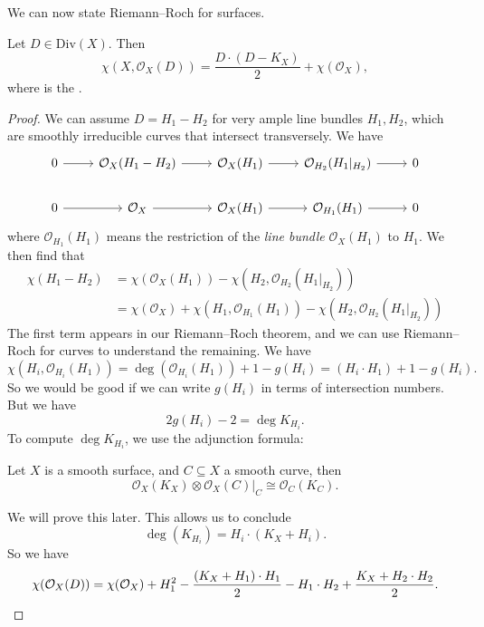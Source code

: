 \documentclass[a4paper]{article}
\newcommand\Div{\mathrm{Div}}
\begin{document}
We can now state Riemann--Roch for surfaces.
\begin{thm}
  Let $D \in \Div(X)$. Then
  \[
    \chi(X, \mathcal{O}_X(D)) = \frac{D \cdot (D - K_X)}{2} + \chi(\mathcal{O}_X),
  \]
  where  is the .
\end{thm}

\begin{proof}
  We can assume $D = H_1 - H_2$ for very ample line bundles $H_1, H_2$, which are smoothly irreducible curves that intersect transversely. We have
  \[
    \begin{tikzcd}
      0 \ar[r] & \mathcal{O}_X(H_1 - H_2) \ar[r] & \mathcal{O}_X(H_1) \ar[r] & \mathcal{O}_{H_2}(H_1|_{H_2}) \ar[r] & 0\\
      0 \ar[r] & \mathcal{O}_X \ar[r] & \mathcal{O}_X(H_1) \ar[r] & \mathcal{O}_{H_1}(H_1) \ar[r] & 0
    \end{tikzcd}
  \]
  where $\mathcal{O}_{H_1}(H_1)$ means the restriction of the \emph{line bundle} $\mathcal{O}_X(H_1)$ to $H_1$. We then find that
  \begin{align*}
    \chi(H_1 - H_2) &= \chi(\mathcal{O}_X(H_1)) - \chi(H_2, \mathcal{O}_{H_2}(H_1|_{H_2}))\\
    &= \chi(\mathcal{O}_X) + \chi(H_1, \mathcal{O}_{H_1}(H_1)) - \chi(H_2, \mathcal{O}_{H_2}(H_1|_{H_2}))
  \end{align*}
  The first term appears in our Riemann--Roch theorem, and we can use Riemann--Roch for curves to understand the remaining. We have
  \[
    \chi(H_i, \mathcal{O}_{H_i}(H_1)) = \deg(\mathcal{O}_{H_i}(H_1)) + 1 - g(H_i) = (H_i \cdot H_1) + 1 - g(H_i).
  \]
  So we would be good if we can write $g(H_i)$ in terms of intersection numbers. But we have
  \[
    2g(H_i) - 2 = \deg K_{H_i}.
  \]
  To compute $\deg K_{H_i}$, we use the adjunction formula:
  \begin{thm}
    Let $X$ is a smooth surface, and $C \subseteq X$ a smooth curve, then
    \[
      \mathcal{O}_X(K_X) \otimes \mathcal{O}_X(C)|_C \cong \mathcal{O}_C(K_C).
    \]
  \end{thm}
  We will prove this later. This allows us to conclude
  \[
    \deg(K_{H_i}) = H_i \cdot (K_X + H_i).
  \]
  So we have
  \[
    \chi(\mathcal{O}_X(D)) = \chi(\mathcal{O}_X) + H_1^2 - \frac{(K_X + H_1) \cdot H_1}{2} - H_1 \cdot H_2 + \frac{K_X + H_2 \cdot H_2}{2}.\qedhere
  \]
\end{proof}
\end{document}
